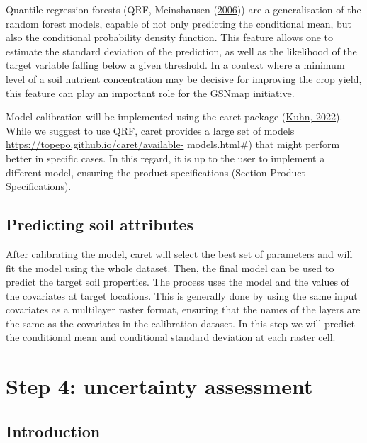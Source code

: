 \documentclass[
  10pt,
  b5paper,
  oneside]{book}
\begin{document}
Quantile regression forests (QRF, Meinshausen (\protect\hyperlink{ref-Meinshausen2006}{2006})) are a generalisation of the random forest models, capable of not only predicting the conditional mean, but also the conditional probability density function. This feature allows one to estimate the standard deviation of the prediction, as well as the likelihood of the target variable falling below a given threshold. In a context where a minimum level of a soil nutrient concentration may be decisive for improving the crop yield, this feature can play an important role for the GSNmap initiative.

Model calibration will be implemented using the caret package (\protect\hyperlink{ref-Kuhn2022}{Kuhn, 2022}). While we suggest to use QRF, caret provides a large set of models \url{https://topepo.github.io/caret/available-} models.html\#) that might perform better in specific cases. In this regard, it is up to the user to implement a different model, ensuring the product specifications (Section Product Specifications).

\hypertarget{predicting-soil-attributes}{%
\section{Predicting soil attributes}\label{predicting-soil-attributes}}

After calibrating the model, caret will select the best set of parameters and will fit the model using the whole dataset. Then, the final model can be used to predict the target soil properties. The process uses the model and the values of the covariates at target locations. This is generally done by using the same input covariates as a multilayer raster format, ensuring that the names of the layers are the same as the covariates in the calibration dataset. In this step we will predict the conditional mean and conditional standard deviation at each raster cell.

\hypertarget{step-4-uncertainty-assessment}{%
\chapter{Step 4: uncertainty assessment}\label{step-4-uncertainty-assessment}}

\hypertarget{introduction}{%
\section{Introduction}\label{introduction}}
\end{document}
